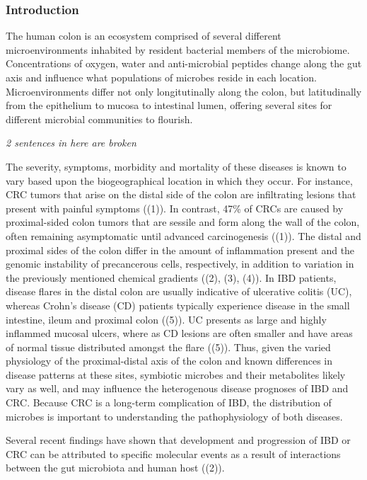 \documentclass[11pt,]{article}
\begin{document}
\subsubsection{Introduction}\label{introduction}

The human colon is an ecosystem comprised of several different
microenvironments inhabited by resident bacterial members of the
microbiome. Concentrations of oxygen, water and anti-microbial peptides
change along the gut axis and influence what populations of microbes
reside in each location. Microenvironments differ not only
longitutinally along the colon, but latitudinally from the epithelium to
mucosa to intestinal lumen, offering several sites for different
microbial communities to flourish.

\emph{2 sentences in here are broken}

The severity, symptoms, morbidity and mortality of these diseases is
known to vary based upon the biogeographical location in which they
occur. For instance, CRC tumors that arise on the distal side of the
colon are infiltrating lesions that present with painful symptoms ((1)).
In contrast, 47\% of CRCs are caused by proximal-sided colon tumors that
are sessile and form along the wall of the colon, often remaining
asymptomatic until advanced carcinogenesis ((1)). The distal and
proximal sides of the colon differ in the amount of inflammation present
and the genomic instability of precancerous cells, respectively, in
addition to variation in the previously mentioned chemical gradients
((2), (3), (4)). In IBD patients, disease flares in the distal colon are
usually indicative of ulcerative colitis (UC), whereas Crohn's disease
(CD) patients typically experience disease in the small intestine, ileum
and proximal colon ((5)). UC presents as large and highly inflammed
mucosal ulcers, where as CD lesions are often smaller and have areas of
normal tissue distributed amongst the flare ((5)). Thus, given the
varied physiology of the proximal-distal axis of the colon and known
differences in disease patterns at these sites, symbiotic microbes and
their metabolites likely vary as well, and may influence the
heterogenous disease prognoses of IBD and CRC. Because CRC is a
long-term complication of IBD, the distribution of microbes is important
to understanding the pathophysiology of both diseases.

Several recent findings have shown that development and progression of
IBD or CRC can be attributed to specific molecular events as a result of
interactions between the gut microbiota and human host ((2)).
\end{document}
